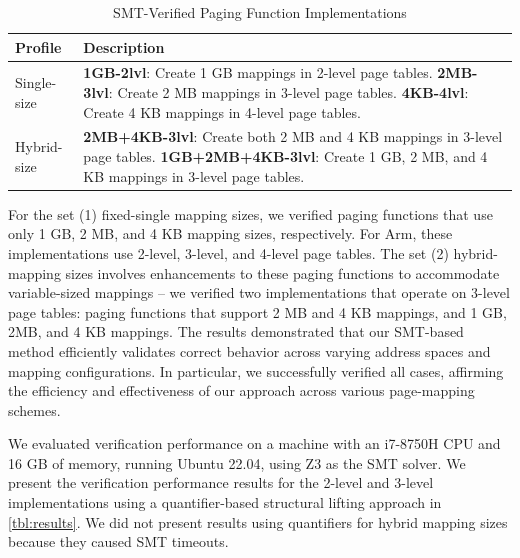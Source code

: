 \begin{table}[t]
\centering
\caption{SMT-Verified Paging Function Implementations}
\label{tbl:pf-profiles}
\small
\begin{tabular}{ |p{1.5cm}|p{6.00cm}| }
    \hline
    \textbf{Profile} & \textbf{Description} \\
    \hline 
     Single-size & \textbf{1GB-2lvl}: Create 1 GB mappings in 2-level page tables. \textbf{2MB-3lvl}: Create 2 MB mappings in 3-level page tables. \textbf{4KB-4lvl}: Create 4 KB mappings in 4-level page tables.\\
    \hline
    Hybrid-size & \textbf{2MB+4KB-3lvl}: Create both 2 MB and 4 KB mappings in 3-level page tables. \textbf{1GB+2MB+4KB-3lvl}: Create 1 GB, 2 MB, and 4 KB mappings in 3-level page tables.\\ 
    \hline 
\end{tabular}
\end{table}

For the set (1) fixed-single mapping sizes, we verified paging functions that use only 1 GB, 2 MB, and 4 KB mapping sizes, respectively. For Arm, these implementations use 2-level, 3-level, and 4-level page tables. The set (2) hybrid-mapping sizes involves enhancements to these paging functions to accommodate variable-sized mappings -- we verified two implementations that operate on 3-level page tables: paging functions that support 2 MB and 4 KB mappings, and 1 GB, 2MB, and 4 KB mappings. The results demonstrated that our SMT-based method efficiently validates correct behavior across varying address spaces and mapping configurations. In particular, we successfully verified all cases, affirming the efficiency and effectiveness of our approach across various page-mapping schemes.

We evaluated verification performance on a machine with an i7-8750H CPU and 16 GB of memory, running Ubuntu 22.04, using Z3 as the SMT solver. We present the verification performance results for the 2-level and 3-level implementations using a quantifier-based structural lifting approach in \autoref{tbl:results}. We did not present results using quantifiers for hybrid mapping sizes because they caused SMT timeouts.

